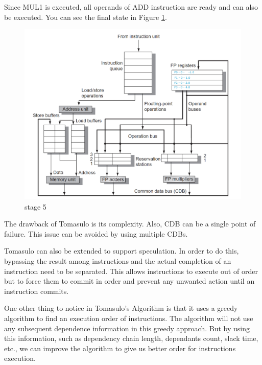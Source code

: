 \documentclass[12pt]{article}
\begin{document}
Since MUL1 is executed, all operands of ADD instruction are ready and can also be executed. You can see the final state in Figure \ref{fig:tom6}.

\begin{figure}[H]
	\centering
	\includegraphics[width=1\textwidth]{./images/tomas/e5.png}	
	\cprotect\caption{stage 5}
	\label{fig:tom6}
\end{figure}


The drawback of Tomasulo is its complexity. Also, CDB can be a single point of failure. This issue can be avoided by using multiple CDBs.

Tomasulo can also be extended to support speculation. In order to do this, bypassing the result among instructions and the actual completion of an instruction need to be separated. This allows instructions to execute
out of order but to force them to commit in order and prevent any unwanted action until an instruction commits.

One other thing to notice in Tomasulo's Algorithm is that it uses a greedy algorithm to find an execution order of instructions.
The algorithm will not use any subsequent dependence information in this greedy approach. But by using this information, such as dependency chain length, dependants count, slack time, etc., we can improve the algorithm to give us better order for instructions execution.


\end{document}
